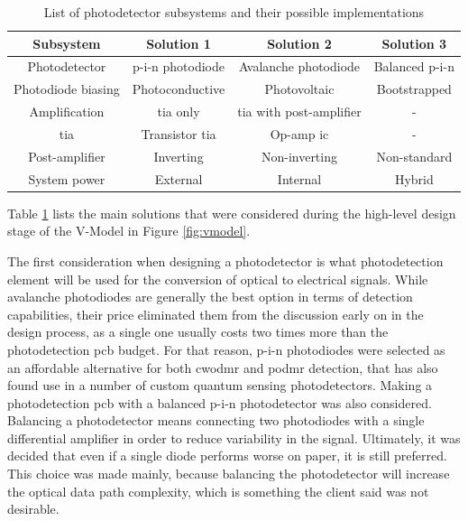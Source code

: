 \begin{table}[!ht]
	\centering
	\begin{tabular}{|c||c|c|c|}
		\hline
		Subsystem 		& Solution 1 & Solution 2	& Solution 3 \\
		\hline
		Photodetector 	& p-i-n photodiode 	& Avalanche photodiode	& Balanced p-i-n  \\
		\hline
		
		Photodiode biasing 	& Photoconductive	& Photovoltaic	& Bootstrapped 	\\
		\hline
		
		Amplification 	& \gls{tia} only	& \gls{tia} with post-amplifier	 & - \\
		\hline
		
		\gls{tia} 		& Transistor \gls{tia}	& Op-amp \gls{ic} & - \\
		\hline
		
		Post-amplifier 	& Inverting 			& Non-inverting			& Non-standard  	\\
		\hline
		
		System power	& External & Internal	& Hybrid \\
		\hline
		
	\end{tabular}
	\caption{List of photodetector subsystems and their possible implementations}
	\label{tab:fd:reqs}
\end{table} 

Table \ref{tab:fd:reqs} lists the main solutions that were considered during the high-level design stage of the V-Model in Figure \ref{fig:vmodel}.

The first consideration when designing a photodetector is what photodetection element will be used for the conversion of optical to electrical signals. While avalanche photodiodes are generally the best option in terms of detection capabilities, their price eliminated them from the discussion early on in the design process, as a single one usually costs two times more than the photodetection \gls{pcb} budget. For that reason, p-i-n photodiodes were selected as an affordable alternative for both \gls{cwodmr} and \gls{podmr} detection, that has also found use in a number of custom quantum sensing photodetectors. Making a photodetection \gls{pcb} with a balanced p-i-n photodetector was also considered. Balancing a photodetector means connecting two photodiodes with a single differential amplifier in order to reduce variability in the signal. Ultimately, it was decided that even if a single diode performs worse on paper, it is still preferred. This choice was made mainly, because balancing the photodetector will increase the optical data path complexity, which is something the client said was not desirable.


